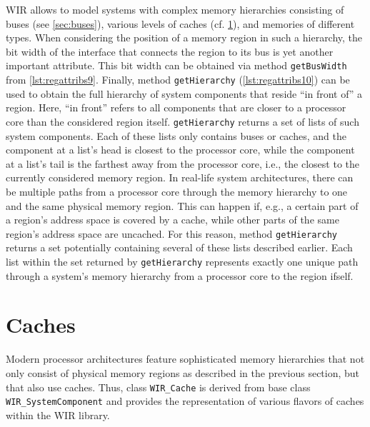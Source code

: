 \gls{WIR} allows to model systems with complex memory hierarchies consisting of buses (see \cref{sec:buses}), various levels of caches (cf. \cref{sec:caches}), and memories of different types.
When considering the position of a memory region in such a hierarchy, the bit width of the interface that connects the region to its bus is yet another important attribute.
This bit width can be obtained via method \texttt{getBusWidth} from \cref{lst:regattribs9}.
Finally, method \texttt{getHierarchy} (\cref{lst:regattribs10}) can be used to obtain the full hierarchy of system components that reside ``in front of'' a region.
Here, ``in front'' refers to all components that are closer to a processor core than the considered region itself.
\texttt{getHierarchy} returns a set of lists of such system components.
Each of these lists only contains buses or caches, and the component at a list's head is closest to the processor core, while the component at a list's tail is the farthest away from the processor core, i.e., the closest to the currently considered memory region.
In real-life system architectures, there can be multiple paths from a processor core through the memory hierarchy to one and the same physical memory region.
This can happen if, e.g., a certain part of a region's address space is covered by a cache, while other parts of the same region's address space are uncached.
For this reason, method \texttt{getHierarchy} returns a set potentially containing several of these lists described earlier.
Each list within the set returned by \texttt{getHierarchy} represents exactly one unique path through a system's memory hierarchy from a processor core to the region ifself.


\section{Caches}
\label{sec:caches}

Modern processor architectures feature sophisticated memory hierarchies that not only consist of physical memory regions as described in the previous section, but that also use caches.
Thus, class \texttt{WIR\_Cache} is derived from base class \texttt{WIR\_SystemComponent} and provides the representation of various flavors of caches within the \gls{WIR} library.

